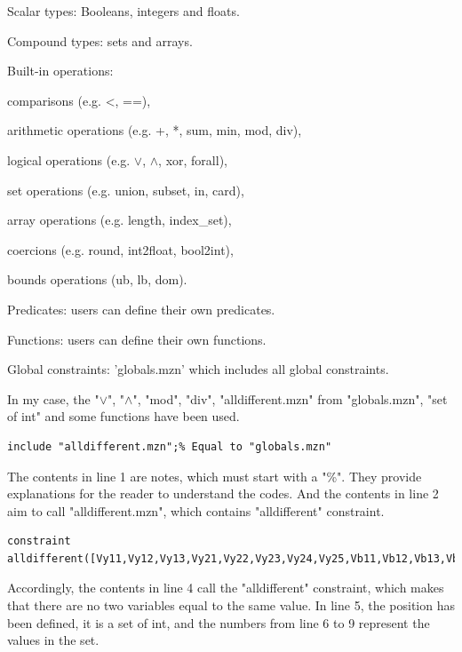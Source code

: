 \begin{compactenum}
  \item Scalar types: Booleans, integers and floats.
  \item Compound types: sets and arrays.
  \item Built-in operations: 
  \begin{compactitem}
  \item comparisons (e.g. <, ==),
  \item arithmetic operations (e.g. +, *, sum, min, mod, div),
  \item logical operations (e.g. $\vee$, $\wedge$, xor, forall),
  \item set operations (e.g. union, subset, in, card),
  \item array operations (e.g. length, index\_set),
  \item coercions (e.g. round, int2float, bool2int), 
  \item bounds operations (ub, lb, dom).
  \end{compactitem}
  \item Predicates: users can define their own predicates.
  \item Functions: users can define their own functions.
  \item Global constraints: 'globals.mzn' which includes all global constraints.
\end{compactenum}
In my case, the "$\vee$", "$\wedge$", "mod", "div", "alldifferent.mzn" from "globals.mzn", "set of int" and some functions have been used.
\begin{lstlisting}[language=minizinc,firstnumber=1]
% A simple Minizinc example 
include "alldifferent.mzn";% Equal to "globals.mzn"
\end{lstlisting}
The contents in line 1 are notes, which must start with a "\%". They provide explanations for the reader to understand the codes. And the contents in line 2 aim to call "alldifferent.mzn", which contains "alldifferent" constraint.
\begin{lstlisting}[language=minizinc,firstnumber=3]
%all the Vunits are different
constraint alldifferent([Vy11,Vy12,Vy13,Vy21,Vy22,Vy23,Vy24,Vy25,Vb11,Vb12,Vb13,Vb14,Vb15,Vb21,Vb22,Vb23,Vb24,Vg11,Vg12,Vg13,Vg14,Vg21,Vg22,Vg23,Vr11,Vr12,Vr13,Vr14,Vr21,Vr22,Vr23,Vr24]);
\end{lstlisting}
Accordingly, the contents in line 4 call the "alldifferent" constraint, which makes that there are no two variables equal to the same value. 
In line 5, the position has been defined, it is a set of int, and the numbers from line 6 to 9 represent the values in the set.
